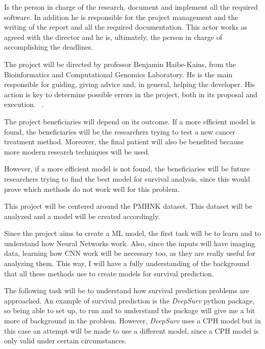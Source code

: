 
Is the person in charge of the research, document and implement all the required software.
In addition he is responsible for the project management and the writing of the report
and all the required documentation. This actor works as agreed with the director and
he is, ultimately, the person in charge of accomplishing the deadlines.

The project will be directed by professor Benjamin Haibe-Kains, from the Bioinformatics 
and Computational Genomics Laboratory. He is the main responsible for guiding, giving 
advice and, in general, helping the developer.
His action is key to determine possible errors in the project, both in its proposal and 
execution.
~\cite{bhklab}.

The project beneficiaries will depend on its outcome. If a more efficient model is found, the
beneficiaries will be the researchers trying to test a new cancer treatment method. Moreover,
the final patient will also be benefited because more modern research techniques will be used.

However, if a more efficient model is not found, the beneficiaries will be future researchers
trying to find the best model for survival analysis, since this would prove which 
methods do not work well for this problem.


This project will be centered around the \gls{PMHNK} dataset. This dataset will be analyzed
and a model will be created accordingly.

Since the project aims to create a \gls{ML} model, the first task will be to learn and 
to understand how Neural Networks work. Also, since the inputs will have imaging data, learning
how \gls{CNN} work will be necessary too, as they are really useful for analyzing them. 
This way, I will have a fully understanding of the 
background that all these methods use to create models for survival prediction.

The following task will be to understand how survival prediction problems are approached. An
example of survival prediction is the \emph{DeepSurv} python package, so being able to set 
up, to run and to understand the package will give me a bit more of background in the problem.
However, \emph{DeepSurv} uses a \gls{CPH} model but in this case an attempt will be made to use
a different model, since a \gls{CPH} model is only valid under certain circumstances.
~\cite{medical:deep-surv-github, medical:cox}

